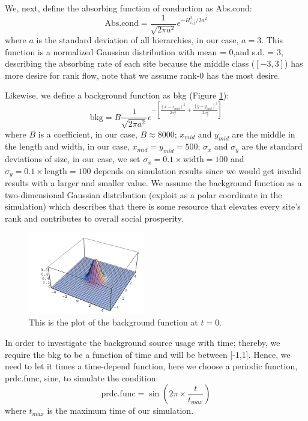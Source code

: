 \documentclass[10pt]{article}
\begin{document}
\begin{multicols}{2}
         We, next, define the absorbing function of conduction as Abs.cond:
        \[
            \text{Abs.cond} = \frac{1}{\sqrt{2 \pi a^2}} e^{-H_{i,j}^2 / 2 a^2}
        \]
        where $a$ is the standard deviation of all hierarchies, in our case, $a = 3$.
        This function is a normalized Gaussian distribution with mean = 0,and s.d. = 3, describing the absorbing rate of each site because the middle class ($[-3,3]$) has more desire for rank flow, note that we assume rank-0 has the most desire.

        Likewise, we define a background function as bkg (Figure \ref{bkg}):
        \[
            \text{bkg} = B \frac{1}{\sqrt{2 \pi a^2}} e^{- [\frac{(x - x_{mid})^2 }{2  \sigma_x^2 } + \frac{(y - y_{mid})^2}{2  \sigma_y^2 }]}
        \]
        where $B$ is a coefficient, in our case, $B \approx 8000$; $x_{mid}$ and ${y_{mid}}$ are the middle in the length and width, in our case, ${x_{mid}} = {y_{mid}} = 500$; $\sigma_x$ and $\sigma_y$ are the standard deviations of size, in our case, we set $\sigma_x = 0.1 \times \text{width} = 100$ and $\sigma_y = 0.1 \times \text{length} = 100$ depends on simulation results since we would get invalid results with a larger and smaller value. We assume the background function as a two-dimensional Gaussian distribution (exploit as a polar coordinate in the simulation) which describes that there is some resource that elevates every site's rank and contributes to overall social prosperity. 
        
    \begin{figure}[H]
        \centering 
        \includegraphics[width = 0.45\textwidth]{bkg.PNG}
        \caption{This is the plot of the background function at $t = 0$.}
        \label{bkg}
    \end{figure}

        In order to investigate the background source usage with time; thereby, we require the bkg to be a function of time and will be between [-1,1]. Hence, we need to let it times a time-depend function, here we choose a periodic function, prdc.func, sine, to simulate the condition:
        \[
            \text{prdc.func} = \sin (2\pi \times \frac{t}{t_{max}})
        \]
        where $t_{max}$ is the maximum time of our simulation.
        

\end{multicols}
\end{document}
